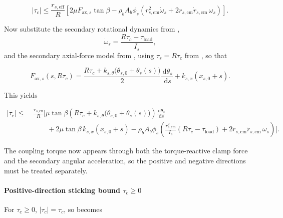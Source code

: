 \documentclass[11pt]{article}
\numberwithin{equation}{section}
\newcommand{\dd}{\,\mathrm{d}}
\begin{document}
\begin{equation}
|\tau_c|
\le
\frac{r_{s,\mathrm{eff}}}{R}
\left[
2\mu F_{\mathrm{ax},s}\tan\beta
-
\rho_b A_b \phi_s
\left(
r_{s,\mathrm{cm}}^2\dot\omega_s
+
2r_{s,\mathrm{cm}}\dot r_{s,\mathrm{cm}}\,\omega_s
\right)
\right].
\label{eq:tau_c_capacity_stick_mid_secondary}
\end{equation}

Now substitute the secondary rotational dynamics from
,
\begin{equation}
\dot\omega_s
=
\frac{R\tau_c-\tau_{\mathrm{load}}}{I_s},
\label{eq:omega_s_dot_sub_stick}
\end{equation}
and the secondary axial-force model from ,
using \(\tau_s = R\tau_c\) from , so that

\begin{equation}
F_{\mathrm{ax},s}(s,R\tau_c)
=
\frac{
R\tau_c + k_{s,\theta}\!\bigl(\theta_{s,0}+\theta_s(s)\bigr)
}{2}
\frac{\dd \theta_s}{\dd s}
+
k_{s,x}(x_{s,0}+s).
\label{eq:Fax_s_sub_stick_tau_c}
\end{equation}

This yields

\begin{equation}
\begin{aligned}
|\tau_c|
\le\;&
\frac{r_{s,\mathrm{eff}}}{R}
\Biggl[
\mu\tan\beta
\left(
R\tau_c
+
k_{s,\theta}\!\bigl(\theta_{s,0}+\theta_s(s)\bigr)
\right)
\frac{\dd \theta_s}{\dd s}
\\[4pt]
&\qquad
+
2\mu\tan\beta\,k_{s,x}(x_{s,0}+s)
-
\rho_b A_b \phi_s
\left(
\frac{r_{s,\mathrm{cm}}^2}{I_s}(R\tau_c-\tau_{\mathrm{load}})
+
2r_{s,\mathrm{cm}}\dot r_{s,\mathrm{cm}}\,\omega_s
\right)
\Biggr].
\end{aligned}
\label{eq:tau_c_capacity_stick_explicit_secondary}
\end{equation}

The coupling torque now appears through both the torque-reactive clamp force
and the secondary angular acceleration, so the positive and negative
directions must be treated separately.

\paragraph{Positive-direction sticking bound \(\tau_c \ge 0\)}

For \(\tau_c \ge 0\), \(|\tau_c|=\tau_c\), so
 becomes
\end{document}
